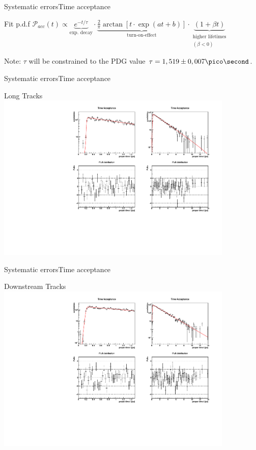 \documentclass{beamer}
\begin{document}
\begin{frame}{Systematic errors}{Time acceptance}
    \begin{block}{Fit p.d.f}
    $\mathcal{P}_{acc}(t) \propto \underbrace{e^{-t/\tau}}_{\text{exp. decay}} \cdot \underbrace{\frac{2}{\pi}\arctan[t\cdot \exp(at+b)]}_{\text{turn-on-effect}} \cdot \underbrace{(1 + \beta t)}_{\substack{\text{higher lifetimes} \\(\beta<0)}}$
    \end{block}
    \begin{alert}{Note:}
    $\tau$ will be constrained to the PDG value $\tau = 1,519 \pm 0,007 \pico\second$.
    \end{alert}
\end{frame}

\begin{frame}{Systematic errors}{Time acceptance}
\begin{block}{Long Tracks}
\centering
\includegraphics[width=0.85\textwidth]{time_acceptance_fit_lt}
\end{block}
\end{frame}

\begin{frame}{Systematic errors}{Time acceptance}
\begin{block}{Downstream Tracks}
\centering
\includegraphics[width=0.85\textwidth]{time_acceptance_fit_ds}
\end{block}
\end{frame}
\end{document}
